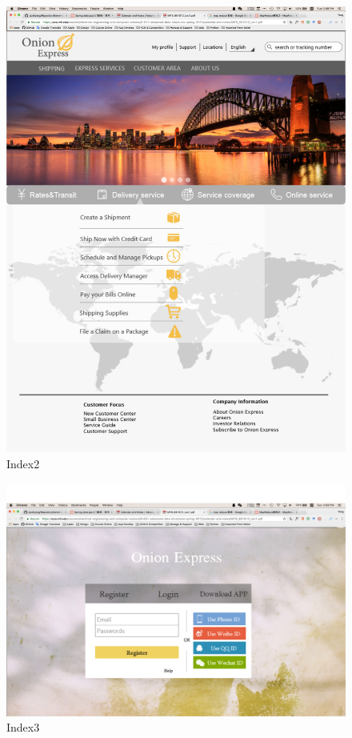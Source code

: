 \documentclass[12pt]{scrreprt}
\begin{document}
\begin{figure}[htbp]
  \centering\includegraphics[width=6in]{DocumentRes/index2.png}
  \caption{Index2}
\end{figure}
\begin{figure}[htbp]
  \centering\includegraphics[width=6in]{DocumentRes/index3.png}
  \caption{Index3}
\end{figure}
\end{document}
